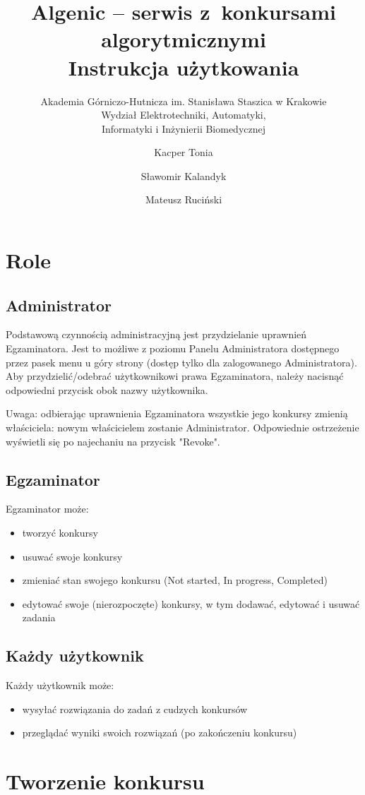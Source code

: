 \documentclass{article}
\title{Algenic -- serwis z~konkursami algorytmicznymi\\
Instrukcja użytkowania}
\subtitle{Akademia Górniczo-Hutnicza im. Stanisława Staszica w Krakowie\\
	Wydział Elektrotechniki, Automatyki,\\
	Informatyki i Inżynierii Biomedycznej}
\author{Kacper Tonia\and
		Sławomir Kalandyk\and
		Mateusz Ruciński}
\date{}
\begin{document}
\maketitle

\section{Role}
\subsection{Administrator}
Podstawową czynnością administracyjną jest przydzielanie uprawnień Egzaminatora. Jest to możliwe z poziomu Panelu Administratora dostępnego przez pasek menu u góry strony (dostęp tylko dla zalogowanego Administratora). Aby przydzielić/odebrać użytkownikowi prawa Egzaminatora, należy nacisnąć odpowiedni przycisk obok nazwy użytkownika.

Uwaga: odbierając uprawnienia Egzaminatora wszystkie jego konkursy zmienią właściciela: nowym właścicielem zostanie Administrator. Odpowiednie ostrzeżenie wyświetli się po najechaniu na przycisk "Revoke".

\subsection{Egzaminator}
Egzaminator może:
\begin{itemize}
    \item tworzyć konkursy
    \item usuwać swoje konkursy
    \item zmieniać stan swojego konkursu (Not started, In progress, Completed)
    \item edytować swoje (nierozpoczęte) konkursy, w tym dodawać, edytować i usuwać zadania
\end{itemize}

\subsection{Każdy użytkownik}
Każdy użytkownik może:
\begin{itemize}
    \item wysyłać rozwiązania do zadań z cudzych konkursów
    \item przeglądać wyniki swoich rozwiązań (po zakończeniu konkursu)
\end{itemize}

\section{Tworzenie konkursu}
\begin{enumerate}
\end{enumerate}
\end{document}
